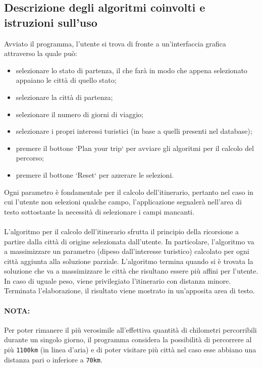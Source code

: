 \documentclass[12pt, a4paper]{article}
\begin{document}
	\subsection{ Descrizione degli algoritmi coinvolti e istruzioni sull'uso}
	Avviato il programma, l'utente si trova di fronte a un'interfaccia grafica attraverso la quale può:
	\begin{itemize}
	\item selezionare lo stato di partenza, il che farà in modo che appena selezionato appaiano le città di quello stato;
	\item selezionare la città di partenza;
	\item selezionare il numero di giorni di viaggio;
	\item selezionare i propri interessi turistici (in base a quelli presenti nel database);
	\item premere il bottone `Plan your trip` per avviare gli algoritmi per il calcolo del percorso;
	\item premere il bottone `Reset` per azzerare le selezioni.
\end{itemize}
	Ogni parametro è fondamentale per il calcolo dell'itinerario, pertanto nel caso in cui l'utente non selezioni qualche campo, l'applicazione segnalerà nell'area di testo sottostante la necessità di selezionare i campi mancanti.
	\\\\	L'algoritmo per il calcolo dell'itinerario sfrutta il principio della ricorsione a partire dalla città di origine selezionata dall'utente. In particolare, l'algoritmo va a massimizzare un parametro (dipeso dall'interesse turistico) calcolato per ogni città aggiunta alla soluzione parziale. L'algoritmo termina quando si è trovata la soluzione che va a massimizzare le città che risultano essere più affini per l'utente.\\ In caso di uguale peso, viene privilegiato l'itinerario con distanza minore.
	\\
	Terminata l'elaborazione, il risultato viene mostrato in un'apposita area di testo.
	
	\paragraph{NOTA:\\} Per poter rimanere il più verosimile all'effettiva quantità di chilometri percorribili durante un singolo giorno, il programma considera la possibilità di percorrere al più \verb*|1100km| (in linea d'aria) e di poter visitare più città nel caso esse abbiano una distanza pari o inferiore a \verb*|70km|.
	
\end{document}
